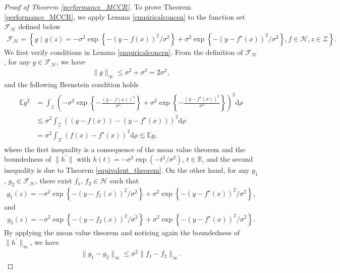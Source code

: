 \documentclass[11pt]{article}
\begin{document}
\begin{proof}[Proof of Theorem \ref{performance_MCCR}]
To prove Theorem \ref{performance_MCCR}, we apply Lemma \ref{empiricalconcen} to the function set $\mathcal{F}_\mathcal{H}$ defined below
\begin{align*}
\mathcal{F}_\mathcal{H}=\left\{g \,\,\Big |\,\, g(z)=-\sigma^2\exp\left\{-(y-f(x))^2/\sigma^2\right\}+
\sigma^2\exp\left\{-(y-f^\star(x))^2/\sigma^2\right\},
f\in\mathcal{H},z\in\mathcal{Z}\right\}.
\end{align*}
	We first verify conditions in Lemma \ref{empiricalconcen}. From the definition of $\mathcal{F}_\mathcal{H}$, for any $g\in\mathcal{F}_\mathcal{H}$, we have
	\begin{align*}
	\|g\|_\infty\leq \sigma^2+\sigma^2=2\sigma^2,
	\end{align*}
	and the following Bernstein condition holds
	\begin{align}\label{Bernstein_condition}
	\begin{split}
	\mathbb{E}g^2&=\int_\mathcal{Z}\left(-\sigma^2\exp\left\{-\frac{(y-f(x))^2}{\sigma^2}\right\}+
	\sigma^2\exp\left\{-\frac{(y-f^\star(x))^2}{\sigma^2}\right\}\right)^2\mathrm{d}\rho\\
	& \lesssim \sigma^2\int_\mathcal{Z} \left((y-f(x))-(y-f^\star(x))\right)^2\mathrm{d}\rho\\
	&=\sigma^2\int_\mathcal{X}(f(x)-f^\star(x))^2\mathrm{d}\rho \lesssim \mathbb{E}g,
	\end{split}
	\end{align}
	where the first inequality is a consequence of the mean value theorem and the boundedness of $\|h^\prime\|$ with $h(t)=-\sigma^2\exp(-t^2/\sigma^2)$, $t\in\mathbb{R}$, and the second inequality is due to Theorem \ref{equivalent_theorem}. On the other hand, for any $g_1$, $g_2\in \mathcal{F}_\mathcal{H}$, there exist $f_1,\,f_2\in\mathcal{H}$ such that
	\begin{align*}
	g_1(z)=-\sigma^2\exp\left\{-(y-f_1(x))^2/\sigma^2\right\}+
	\sigma^2\exp\left\{-(y-f^\star(x))^2/\sigma^2\right\},
	\end{align*} 
	and  
	\begin{align*}
	g_2(z)=-\sigma^2\exp\left\{-(y-f_2(x))^2/\sigma^2\right\}+
	\sigma^2\exp\left\{-(y-f^\star(x))^2/\sigma^2\right\}.
	\end{align*}
	By applying the mean value theorem and noticing again the boundedness of $\|h^{\prime}\|_\infty$, we have
	\begin{align*}
	\|g_1-g_2\|_\infty\leq \sigma^2\|f_1-f_2\|_\infty.

\end{align*}
\end{proof}
\end{document}
